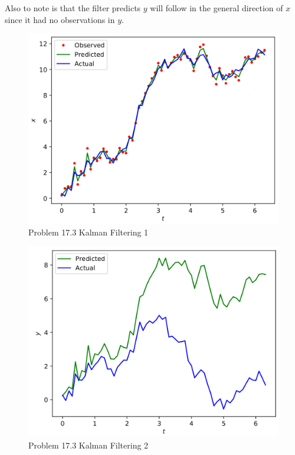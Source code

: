 \documentclass{article}
\begin{document}
Also to note is that the filter predicts $y$ will follow in the general 
direction of $x$ since it had no observations in $y$.

\newpage

\begin{figure}[h]
    \centering
    \includegraphics[scale=1]{problem17_3_x}
    \caption{Problem 17.3 Kalman Filtering 1}
    \label{fig:p17_3x}
\end{figure}

\begin{figure}[h]
    \centering
    \includegraphics[scale=1]{problem17_3_y}
    \caption{Problem 17.3 Kalman Filtering 2}
    \label{fig:p17_3y}
\end{figure}
\end{document}
